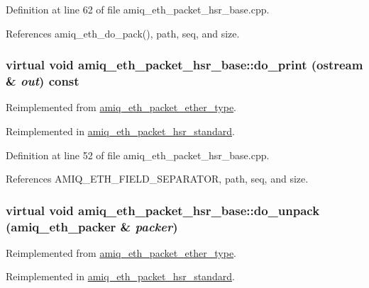 Definition at line 62 of file amiq\_\-eth\_\-packet\_\-hsr\_\-base.cpp.

References amiq\_\-eth\_\-do\_\-pack(), path, seq, and size.\hypertarget{classamiq__eth__packet__hsr__base_a83b7ccb4b601e00ba5cfbbfde6658632}{
\subsubsection[{do\_\-print}]{\setlength{\rightskip}{0pt plus 5cm}virtual void amiq\_\-eth\_\-packet\_\-hsr\_\-base::do\_\-print (ostream \& {\em out}) const}}
\label{classamiq__eth__packet__hsr__base_a83b7ccb4b601e00ba5cfbbfde6658632}


Reimplemented from \hyperlink{classamiq__eth__packet__ether__type_a9b2852fa1aaf278138fde2232e446f63}{amiq\_\-eth\_\-packet\_\-ether\_\-type}.

Reimplemented in \hyperlink{classamiq__eth__packet__hsr__standard_abaa39d881f90e05ae4acbb7fe5ebca0d}{amiq\_\-eth\_\-packet\_\-hsr\_\-standard}.

Definition at line 52 of file amiq\_\-eth\_\-packet\_\-hsr\_\-base.cpp.

References AMIQ\_\-ETH\_\-FIELD\_\-SEPARATOR, path, seq, and size.\hypertarget{classamiq__eth__packet__hsr__base_ae61de71bd90f7a1c605e094845af5ccc}{
\subsubsection[{do\_\-unpack}]{\setlength{\rightskip}{0pt plus 5cm}virtual void amiq\_\-eth\_\-packet\_\-hsr\_\-base::do\_\-unpack ({\bf amiq\_\-eth\_\-packer} \& {\em packer})}}
\label{classamiq__eth__packet__hsr__base_ae61de71bd90f7a1c605e094845af5ccc}


Reimplemented from \hyperlink{classamiq__eth__packet__ether__type_a0c86ef80c46bbed384739b23e5efb0ef}{amiq\_\-eth\_\-packet\_\-ether\_\-type}.

Reimplemented in \hyperlink{classamiq__eth__packet__hsr__standard_aac95578ea89db3bd0ec190ca87e731c8}{amiq\_\-eth\_\-packet\_\-hsr\_\-standard}.

